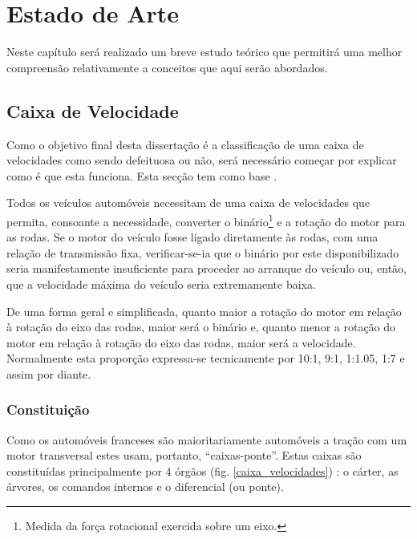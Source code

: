 


\chapter{Estado de Arte}
\label{chapter:Estado de Arte}

\begin{Estado de Arte}

Neste capítulo será realizado um breve estudo teórico que permitirá uma melhor compreensão relativamente a conceitos que aqui serão abordados.

\end{Estado de Arte}

\section{Caixa de Velocidade}
Como o objetivo final desta dissertação é a classificação de uma caixa de velocidades como sendo defeituosa ou não, será necessário começar por explicar como é que esta funciona. Esta secção tem como base \textcite{formacaoCaixa}.

Todos os veículos automóveis necessitam de uma caixa de velocidades que permita, consoante a necessidade, converter o binário\footnote{Medida da força rotacional exercida sobre um eixo.} e a rotação do motor para as rodas.
Se o motor do veículo fosse ligado diretamente às rodas, com uma relação de transmissão fixa, verificar-se-ia que o binário por este disponibilizado seria manifestamente insuficiente para proceder ao arranque do veículo ou, então, que a velocidade máxima do veículo seria extremamente baixa.

De uma forma geral e simplificada, quanto maior a rotação do motor em relação à rotação do eixo das rodas, maior será o binário e, quanto menor a rotação do motor em relação à rotação do eixo das rodas, maior será a velocidade. Normalmente esta proporção expressa-se tecnicamente por 10:1, 9:1, 1:1.05, 1:7 e assim por diante.

\subsection{Constituição}

Como os automóveis franceses são maioritariamente automóveis a tração com um motor transversal estes usam, portanto, ``caixas-ponte''.
Estas caixas são constituídas principalmente por 4 órgãos (fig. \ref{caixa_velocidades}) : o cárter, as árvores, os comandos internos e o diferencial (ou ponte).

